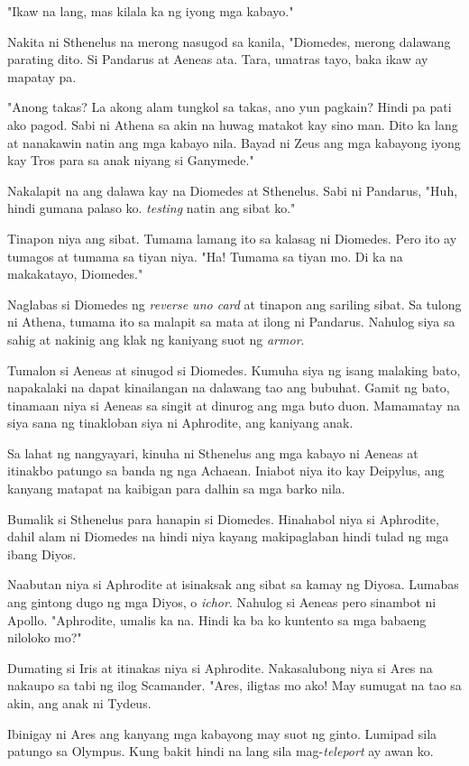 \documentclass[12pt,letterpaper]{report}
\begin{document}
"Ikaw na lang, mas kilala ka ng iyong mga kabayo."

Nakita ni Sthenelus na merong nasugod sa kanila, "Diomedes, merong dalawang parating dito. Si Pandarus at Aeneas ata. Tara, umatras tayo, baka ikaw ay mapatay pa.

"Anong takas? La akong alam tungkol sa takas, ano yun pagkain? Hindi pa pati ako pagod. Sabi ni Athena sa akin na huwag matakot kay sino man. Dito ka lang at nanakawin natin ang mga kabayo nila. Bayad ni Zeus ang mga kabayong iyong kay Tros para sa anak niyang si Ganymede."

Nakalapit na ang dalawa kay na Diomedes at Sthenelus. Sabi ni Pandarus, "Huh, hindi gumana palaso ko. \textit{testing} natin ang sibat ko."

Tinapon niya ang sibat. Tumama lamang ito sa kalasag ni Diomedes. Pero ito ay tumagos at tumama sa tiyan niya. "Ha! Tumama sa tiyan mo. Di ka na makakatayo, Diomedes."

Naglabas si Diomedes ng \textit{reverse uno card} at tinapon ang sariling sibat. Sa tulong ni Athena, tumama ito sa malapit sa mata at ilong ni Pandarus. Nahulog siya sa sahig at nakinig ang klak ng kaniyang suot ng \textit{armor}.

Tumalon si Aeneas at sinugod si Diomedes. Kumuha siya ng isang malaking bato, napakalaki na dapat kinailangan na dalawang tao ang bubuhat. Gamit ng bato, tinamaan niya si Aeneas sa singit at dinurog ang mga buto duon.
Mamamatay na siya sana ng tinakloban siya ni Aphrodite, ang kaniyang anak.

Sa lahat ng nangyayari, kinuha ni Sthenelus ang mga kabayo ni Aeneas at itinakbo patungo sa banda ng nga Achaean. Iniabot niya ito kay Deipylus, ang kanyang matapat na kaibigan para dalhin sa mga barko nila.

Bumalik si Sthenelus para hanapin si Diomedes. Hinahabol niya si Aphrodite, dahil alam ni Diomedes na hindi niya kayang makipaglaban hindi tulad ng mga ibang Diyos.

Naabutan niya si Aphrodite at isinaksak ang sibat sa kamay ng Diyosa. Lumabas ang gintong dugo ng mga Diyos, o \textit{ichor}. Nahulog si Aeneas pero sinambot ni Apollo. "Aphrodite, umalis ka na. Hindi ka ba ko kuntento sa mga babaeng niloloko mo?"

Dumating si Iris at itinakas niya si Aphrodite. Nakasalubong niya si Ares na nakaupo sa tabi ng ilog Scamander. "Ares, iligtas mo ako! May sumugat na tao sa akin, ang anak ni Tydeus.

Ibinigay ni Ares ang kanyang mga kabayong may suot ng ginto. Lumipad sila patungo sa Olympus. Kung bakit hindi na lang sila mag-\textit{teleport} ay awan ko.
\end{document}
